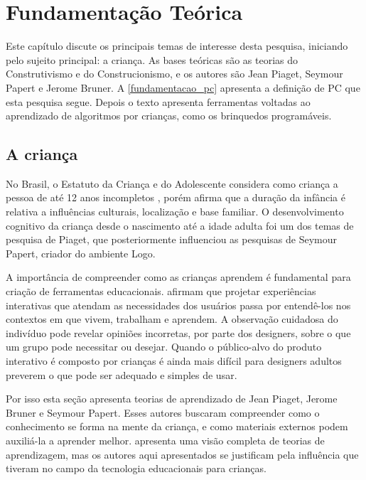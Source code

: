 \chapter{Fundamentação Teórica}
\label{c_fundamentacao_teorica}

Este capítulo discute os principais temas de interesse desta pesquisa, iniciando pelo sujeito principal: a criança. As bases teóricas são as teorias do Construtivismo e do Construcionismo, e os autores são Jean Piaget, Seymour Papert e Jerome Bruner. A \autoref{fundamentacao_pc} apresenta a definição de \ac{PC} que esta pesquisa segue. Depois o texto apresenta ferramentas voltadas ao aprendizado de algoritmos por crianças, como os brinquedos programáveis.

\section{A criança}
\label{fundamentacao_crianca}
No Brasil, o Estatuto da Criança e do Adolescente considera como criança a pessoa de até 12 anos incompletos \cite{brasil_lei_1990}, porém  afirma que a duração da infância é relativa a influências culturais, localização e base familiar. O desenvolvimento cognitivo da criança desde o nascimento até a idade adulta foi um dos temas de pesquisa de Piaget, que posteriormente influenciou as pesquisas de Seymour Papert, criador do ambiente Logo.

A importância de compreender como as crianças aprendem é fundamental para criação de ferramentas educacionais.  afirmam que projetar experiências interativas que atendam as necessidades dos usuários passa por entendê-los nos contextos em que vivem, trabalham e aprendem. A observação cuidadosa do indivíduo pode revelar opiniões incorretas, por parte dos designers, sobre o que um grupo pode necessitar ou desejar. Quando o público-alvo do produto interativo é composto por crianças é ainda mais difícil para designers adultos preverem o que pode ser adequado e simples de usar.

Por isso esta seção apresenta teorias de aprendizado de Jean Piaget, Jerome Bruner e Seymour Papert. Esses autores buscaram compreender como o conhecimento se forma na mente da criança, e como materiais externos podem auxiliá-la a aprender melhor.  apresenta uma visão completa de teorias de aprendizagem, mas os autores aqui apresentados se justificam pela influência que tiveram no campo da tecnologia educacionais para crianças.

